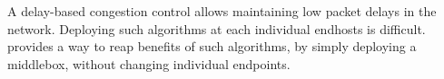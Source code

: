  

 A delay-based congestion control allows maintaining low packet delays in the network. Deploying such algorithms at each individual endhosts is difficult. \name provides a way to reap benefits of such algorithms, by simply deploying a middlebox, without changing individual endpoints.
